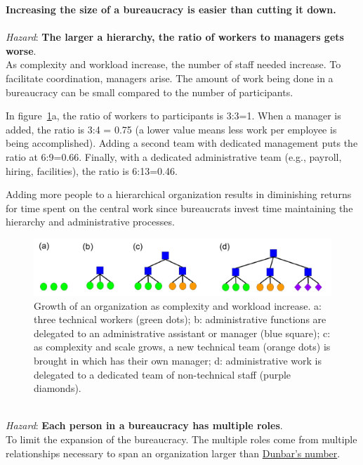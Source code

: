 \textbf{Increasing the size of a bureaucracy is easier than cutting it down.}\\
\ \\

\textit{Hazard}: \textbf{The larger a hierarchy, the ratio of workers to managers gets worse}. \\
As complexity and workload increase, the number of staff needed increase. To facilitate coordination, managers arise. The amount of work being done in a bureaucracy can be small compared to the number of participants.

In figure~\ref{fig:growth_of_bureaucracy}a, the ratio of workers to participants is 3:3=1. When a manager is added, the ratio is 3:4 = 0.75 (a lower value means less work per employee is being accomplished). Adding a second team with dedicated management puts the ratio at 6:9=0.66. Finally, with a dedicated administrative team (e.g., payroll, hiring, facilities), the ratio is 6:13=0.46.

Adding more people to a hierarchical organization results in diminishing returns for time spent on the central work since bureaucrats invest time maintaining the hierarchy and administrative processes.

    \begin{figure}
        \centering
        \includegraphics[width=1\textwidth]{images/growth-of-bureaucracy.pdf}
        \caption{Growth of an organization as complexity and workload increase. a: three technical workers (green dots); b: administrative functions are delegated to an administrative assistant or manager (blue square); c: as complexity and scale grows, a new technical team (orange dots) is brought in which has their own manager; d: administrative work is delegated to a dedicated team of non-technical staff (purple diamonds).}
        \label{fig:growth_of_bureaucracy}
    \end{figure}

\ \\

\textit{Hazard}: \textbf{Each person in a bureaucracy has multiple roles}.\\
To limit the expansion of the bureaucracy. The multiple roles come from multiple relationships necessary to span an organization larger than \href{https://en.wikipedia.org/wiki/Dunbar\%27s_number}{Dunbar's number}. 
\ \\

